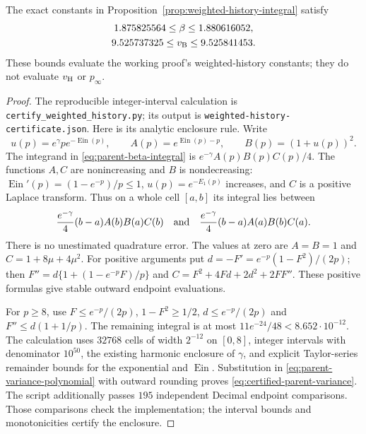 \documentclass[11pt,letterpaper]{article}
\begin{document}
\begin{corollary}
\label{cor:certified-parent-variance}
The exact constants in
Proposition~\ref{prop:weighted-history-integral} satisfy
\begin{equation}\label{eq:certified-parent-variance}
 \begin{gathered}
 1.875825564\le\beta\le1.880616052,\\
 9.525737325\le v_{\rm B}\le9.525841453.
 \end{gathered}
\end{equation}
These bounds evaluate the working proof's weighted-history
constants; they do not evaluate $v_{\rm H}$ or $p_\infty$.
\end{corollary}
\begin{proof}
The reproducible integer-interval calculation is
\nolinkurl{certify_weighted_history.py}; its output is
\nolinkurl{weighted-history-certificate.json}.
Here is its analytic enclosure rule. Write
\[
 u(p)=e^\gamma p e^{-\operatorname{Ein}(p)},\qquad
 A(p)=e^{\operatorname{Ein}(p)-p},\qquad B(p)=(1+u(p))^2.
\]
The integrand in \eqref{eq:parent-beta-integral} is
$e^{-\gamma}A(p)B(p)C(p)/4$.
The functions $A,C$ are nonincreasing and $B$ is nondecreasing:
$\operatorname{Ein}'(p)=(1-e^{-p})/p\le1$,
$u(p)=e^{-E_1(p)}$ increases, and $C$ is a positive Laplace
transform. Thus on a whole cell $[a,b]$ its integral lies between
\[
 \frac{e^{-\gamma}}4(b-a)A(b)B(a)C(b)
 \quad\hbox{and}\quad
 \frac{e^{-\gamma}}4(b-a)A(a)B(b)C(a).
\]
There is no unestimated quadrature error.
The values at zero are $A=B=1$ and $C=1+8\mu+4\mu^2$.
For positive arguments put $d=-F'=e^{-p}(1-F^2)/(2p)$;
then $F''=d\{1+(1-e^{-p}F)/p\}$ and
$C=F^2+4Fd+2d^2+2FF''$. These positive formulas give stable
outward endpoint evaluations.

For $p\ge8$, use $F\le e^{-p}/(2p)$, $1-F^2\ge1/2$,
$d\le e^{-p}/(2p)$ and $F''\le d(1+1/p)$.
The remaining integral is at most
$11e^{-24}/48<8.652\cdot10^{-12}$.
The calculation uses $32768$ cells of width $2^{-12}$ on
$[0,8]$, integer intervals with denominator $10^{50}$,
the existing harmonic enclosure of $\gamma$, and explicit
Taylor-series remainder bounds for the exponential and
$\operatorname{Ein}$. Substitution in
\eqref{eq:parent-variance-polynomial} with outward rounding
proves \eqref{eq:certified-parent-variance}.
The script additionally passes $195$ independent Decimal
endpoint comparisons. Those comparisons check the implementation;
the interval bounds and monotonicities certify the enclosure.
\end{proof}
\end{document}
